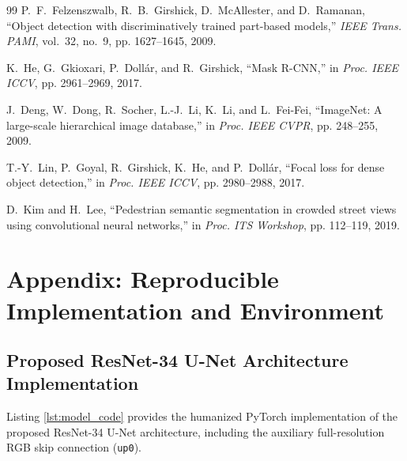 \documentclass[10pt,a4paper]{article}
\begin{document}
\begin{thebibliography}{99}
P.~F.~Felzenszwalb, R.~B.~Girshick, D.~McAllester, and D.~Ramanan, ``Object detection with discriminatively trained part-based models,'' \emph{IEEE Trans. PAMI}, vol.~32, no.~9, pp. 1627--1645, 2009.

K.~He, G.~Gkioxari, P.~Doll{\'a}r, and R.~Girshick, ``Mask R-CNN,'' in \emph{Proc. IEEE ICCV}, pp. 2961--2969, 2017.

J.~Deng, W.~Dong, R.~Socher, L.-J.~Li, K.~Li, and L.~Fei-Fei, ``ImageNet: A large-scale hierarchical image database,'' in \emph{Proc. IEEE CVPR}, pp. 248--255, 2009.

T.-Y.~Lin, P.~Goyal, R.~Girshick, K.~He, and P.~Doll{\'a}r, ``Focal loss for dense object detection,'' in \emph{Proc. IEEE ICCV}, pp. 2980--2988, 2017.

D.~Kim and H.~Lee, ``Pedestrian semantic segmentation in crowded street views using convolutional neural networks,'' in \emph{Proc. ITS Workshop}, pp. 112--119, 2019.
\end{thebibliography}
\endgroup

\section{Appendix: Reproducible Implementation and Environment}

\subsection{Proposed ResNet-34 U-Net Architecture Implementation}
Listing \ref{lst:model_code} provides the humanized PyTorch implementation of the proposed ResNet-34 U-Net architecture, including the auxiliary full-resolution RGB skip connection (\texttt{up0}).
\end{document}

